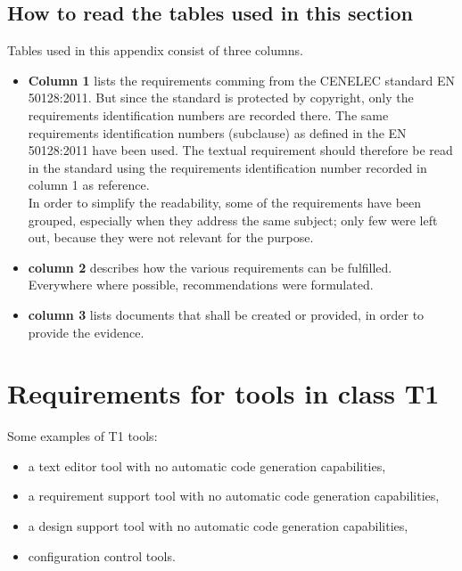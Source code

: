 \documentclass{template/openetcs_report}
\begin{document}
\subsection{How to read the tables used in this section}
Tables used in this appendix consist of three columns.
\begin{itemize}\itemsep=0pt
  \item \textbf{Column 1} lists the requirements comming from the CENELEC standard EN 50128:2011. But since the standard is protected by copyright, only the requirements identification numbers are recorded there. The same requirements identification numbers (subclause) as defined in the EN 50128:2011 have been used. The textual requirement should therefore be read in the standard using the requirements identification number recorded in column 1 as reference.\\
In order to simplify the readability, some of the requirements have been grouped, especially when they address the same subject; only few were left out, because they were not relevant for the purpose.
  \item \textbf{column 2} describes how the various requirements can be fulfilled. Everywhere where possible, recommendations were formulated.
  \item \textbf{column 3} lists documents that shall be created or provided, in order to provide the evidence.
\end{itemize}



\section{Requirements for tools in class T1}
\label{T1}
Some examples of T1 tools:
\begin{itemize}\itemsep=0pt
  \item a text editor tool with no automatic code generation capabilities,
  \item a requirement support tool with no automatic code generation capabilities,
  \item a design support tool with no automatic code generation capabilities,
  \item configuration control tools.
\end{itemize}
\end{document}
